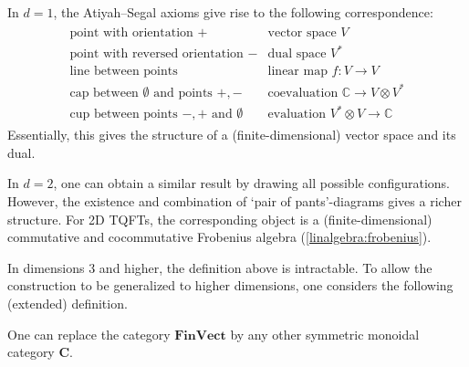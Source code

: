     \begin{example}[1D]
        In $d=1$, the Atiyah--Segal axioms give rise to the following correspondence:
        \begin{gather*}
            \begin{array}{l|l}
                \text{point with orientation } + & \text{vector space } V\\
                \text{point with reversed orientation } - & \text{dual space }V^*\\
                \text{line between points} & \text{linear map }f:V\rightarrow V\\
                \text{cap between $\emptyset$ and points } +,- & \text{coevaluation } \mathbb{C}\rightarrow V\otimes V^*\\
                \text{cup between points $-,+$ and }\emptyset & \text{evaluation }V^*\otimes V\rightarrow\mathbb{C}
            \end{array}
        \end{gather*}
        Essentially, this gives the structure of a (finite-dimensional) vector space and its dual.
    \end{example}

    \begin{example}[2D]
        In $d=2$, one can obtain a similar result by drawing all possible configurations. However, the existence and combination of `pair of pants'-diagrams gives a richer structure. For 2D TQFTs, the corresponding object is a (finite-dimensional) commutative and cocommutative Frobenius algebra (\cref{linalgebra:frobenius}).
    \end{example}

    In dimensions 3 and higher, the definition above is intractable. To allow the construction to be generalized to higher dimensions, one considers the following (extended) definition.
    \begin{remark}
        One can replace the category $\mathbf{FinVect}$ by any other symmetric monoidal category $\mathbf{C}$.
    \end{remark}

